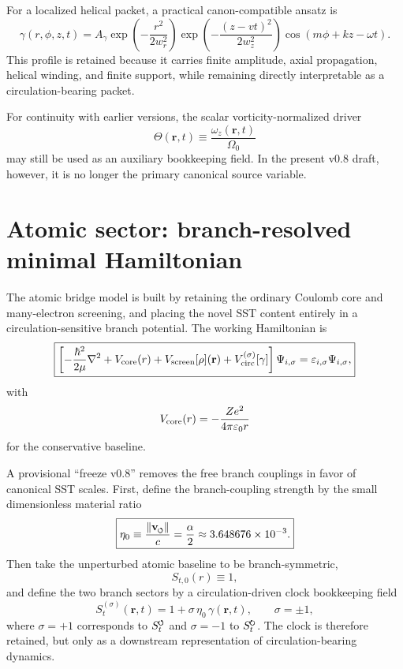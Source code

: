 \documentclass[11pt,a4paper]{article}
\newcommand{\swirlarrow}{\mathchoice{\mkern-2mu\scriptstyle\boldsymbol{\circlearrowleft}}{\mkern-2mu\scriptstyle\boldsymbol{\circlearrowleft}}{\mkern-2mu\scriptscriptstyle\boldsymbol{\circlearrowleft}}{\mkern-2mu\scriptscriptstyle\boldsymbol{\circlearrowleft}}}
\newcommand{\swirlarrowcw}{\mathchoice{\mkern-2mu\scriptstyle\boldsymbol{\circlearrowright}}{\mkern-2mu\scriptstyle\boldsymbol{\circlearrowright}}{\mkern-2mu\scriptscriptstyle\boldsymbol{\circlearrowright}}{\mkern-2mu\scriptscriptstyle\boldsymbol{\circlearrowright}}}
\newcommand{\vswirl}{\mathbf{v}_{\swirlarrow}}
\newcommand{\SwirlClock}{S_t^{\swirlarrow}}
\newcommand{\SwirlClockcw}{S_t^{\swirlarrowcw}}
\begin{document}
For a localized helical packet, a practical canon-compatible ansatz is
\begin{equation}
\label{eq:gammaPacket}
\gamma(r,\phi,z,t)
=
A_\gamma
\exp\!\left(-\frac{r^2}{2w_r^2}\right)
\exp\!\left(-\frac{(z-vt)^2}{2w_z^2}\right)
\cos\!\left(m\phi+kz-\omega t\right).
\end{equation}
This profile is retained because it carries finite amplitude, axial propagation, helical winding, and finite support, while remaining directly interpretable as a circulation-bearing packet.

For continuity with earlier versions, the scalar vorticity-normalized driver
\begin{equation}
\label{eq:ThetaDef}
\Theta(\mathbf r,t) \equiv \frac{\omega_z(\mathbf r,t)}{\Omega_0}
\end{equation}
may still be used as an auxiliary bookkeeping field. In the present v0.8 draft, however, it is no longer the primary canonical source variable.

\section{Atomic sector: branch-resolved minimal Hamiltonian}
The atomic bridge model is built by retaining the ordinary Coulomb core and many-electron screening, and placing the novel SST content entirely in a circulation-sensitive branch potential. The working Hamiltonian is
\begin{equation}
\label{eq:master-H}
\boxed{
\left[
-\frac{\hbar^2}{2\mu}\nabla^2
+V_{\rm core}(r)
+V_{\rm screen}[\rho](\mathbf r)
+V_{\rm circ}^{(\sigma)}[\gamma]
\right]\Psi_{i,\sigma}
=\varepsilon_{i,\sigma}\Psi_{i,\sigma},
}
\end{equation}
with
\begin{equation}
\label{eq:Vcore}
V_{\rm core}(r)=-\frac{Ze^2}{4\pi\varepsilon_0 r}
\end{equation}
for the conservative baseline.

A provisional ``freeze v0.8'' removes the free branch couplings in favor of canonical SST scales. First, define the branch-coupling strength by the small dimensionless material ratio
\begin{equation}
\label{eq:eta0}
\boxed{
\eta_0 \equiv \frac{\lVert\vswirl\rVert}{c} = \frac{\alpha}{2} \approx 3.648676\times 10^{-3}.
}
\end{equation}
Then take the unperturbed atomic baseline to be branch-symmetric,
\begin{equation}
\label{eq:St0freeze}
S_{t,0}(r)\equiv 1,
\end{equation}
and define the two branch sectors by a circulation-driven clock bookkeeping field
\begin{equation}
\label{eq:StBranches}
\boxed{
S_t^{(\sigma)}(\mathbf r,t)=1+\sigma\,\eta_0\,\gamma(\mathbf r,t),
\qquad
\sigma=\pm 1,
}
\end{equation}
where $\sigma=+1$ corresponds to $\SwirlClock$ and $\sigma=-1$ to $\SwirlClockcw$. The clock is therefore retained, but only as a downstream representation of circulation-bearing dynamics.
\end{document}
